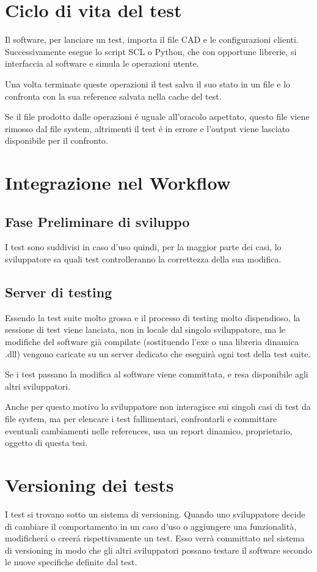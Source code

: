     \section{Ciclo di vita del test}
        Il software, per lanciare un test, importa il file CAD e le configurazioni clienti.
        Successivamente esegue lo script SCL o Python, che con opportune librerie, si interfaccia al software
        e simula le operazioni utente. 
        
        Una volta terminate queste operazioni il test salva il suo stato in un file e lo confronta con la sua reference 
        salvata nella cache del test. 

        Se il file prodotto dalle operazioni \'e uguale all'oracolo aspettato, questo file viene rimosso dal file system, altrimenti il test \'e in errore e l'output viene lasciato disponibile per il confronto.

    \section{Integrazione nel Workflow}
        \subsection{Fase Preliminare di sviluppo}
            I test sono suddivisi in caso d'uso quindi, per la maggior parte dei casi, lo sviluppatore sa quali test controlleranno la correttezza della sua modifica.
            
        \subsection{Server di testing}
            Essendo la test suite molto grossa e il processo di testing molto dispendioso, 
            la sessione di test viene lanciata, non in locale dal singolo sviluppatore, 
            ma le modifiche del software già compilate (sostituendo l’exe o una libreria dinamica .dll) 
            vengono caricate su un server dedicato che eseguirà ogni test della test suite.
            
            Se i test passano la modifica al software viene committata, e resa disponibile agli altri sviluppatori.
            
            Anche per questo motivo lo sviluppatore non interagisce sui singoli casi di test da file system,
            ma per elencare i test fallimentari, confrontarli e committare eventuali cambiamenti nelle references, usa un report dinamico, 
            proprietario, oggetto di questa tesi.
    \section{Versioning dei tests}
        I test si trovano sotto un sistema di versioning.
        Quando uno sviluppatore decide di cambiare il comportamento in un caso d'uso o aggiungere una funzionalità,
        modificher\'a o creer\'a rispettivamente un test.
        Esso verrà committato nel sistema di versioning in modo che gli altri sviluppatori possano testare il software secondo le nuove specifiche definite dal test.         
